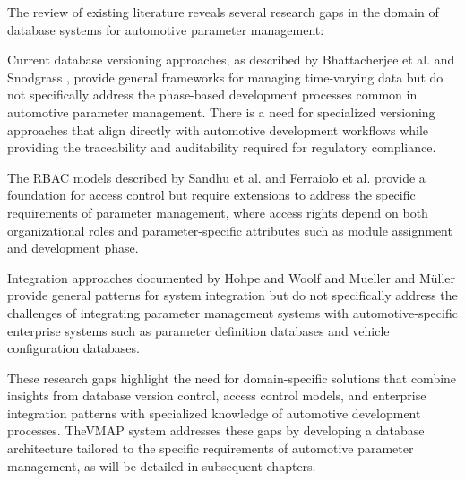The review of existing literature reveals several research gaps in the domain of database systems for automotive parameter management:

Current database versioning approaches, as described by Bhattacherjee et al. \cite{bhattacherjee2015principles} and Snodgrass \cite{snodgrass1999developing}, provide general frameworks for managing time-varying data but do not specifically address the phase-based development processes common in automotive parameter management. There is a need for specialized versioning approaches that align directly with automotive development workflows while providing the traceability and auditability required for regulatory compliance.

The RBAC models described by Sandhu et al. \cite{sandhu1998role} and Ferraiolo et al. \cite{ferraiolo2011policy} provide a foundation for access control but require extensions to address the specific requirements of parameter management, where access rights depend on both organizational roles and parameter-specific attributes such as module assignment and development phase.

Integration approaches documented by Hohpe and Woolf \cite{hohpe2002enterprise} and Mueller and Müller \cite{mueller2018conception} provide general patterns for system integration but do not specifically address the challenges of integrating parameter management systems with automotive-specific enterprise systems such as parameter definition databases and vehicle configuration databases.

These research gaps highlight the need for domain-specific solutions that combine insights from database version control, access control models, and enterprise integration patterns with specialized knowledge of automotive development processes. The\ac{VMAP} system addresses these gaps by developing a database architecture tailored to the specific requirements of automotive parameter management, as will be detailed in subsequent chapters.